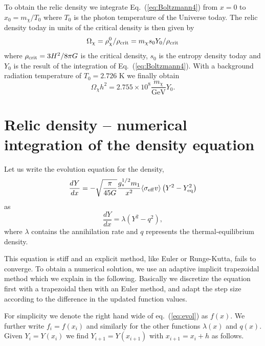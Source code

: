 \documentclass[a4paper,10pt,oneside]{book}
\begin{document}

To obtain the relic density we integrate Eq.~(\ref{eq:Boltzmann4})
from $x=0$ to $x_0=m_\chi/T_0$ where $T_0$ is the photon temperature
of the Universe today. The relic density today in units of the
critical density is then given by
\begin{equation}
  \Omega_\chi = \rho_\chi^0/\rho_{\rm
  crit}=m_\chi s_0 Y_0/\rho_{\rm crit}
\end{equation}
where $\rho_{\rm crit}=3 H^2/8 \pi G$ is the critical density, $s_{0}$ 
is the entropy density today and $Y_{0}$ is the result of the 
integration of Eq.~(\ref{eq:Boltzmann4}). With a
background radiation temperature of $T_0=2.726$ K we finally obtain
\begin{equation} \label{eq:omegah2}
  \Omega_\chi h^2 = 2.755\times 10^8 \frac{m_\chi}{\mbox{GeV}} Y_0.
\end{equation}

\section{Relic density -- numerical integration of the density equation}
\label{sec:numdens}

Let us write the evolution equation for the density,
\begin{equation} \label{eq:Boltzmann4}
  \frac{dY}{dx} = - \sqrt{\frac{\pi}{45G}} \frac{g_{*}^{1/2}m_1}{x^2}
  \langle \sigma_{\rm{eff}} v \rangle \left( Y^2 -
  Y_{\rm{eq}}^2 \right) 
\end{equation}
as
\begin{equation} 
  \frac{dY}{dx} = \lambda (Y^2 - q^2),
  \label{eq:evol}
\end{equation}
where $\lambda$ contains the annihilation rate and $q$ represents the
thermal-equilibrium density.

This equation is stiff and an explicit method, like Euler or Runge-Kutta, fails
to converge. To obtain a numerical solution, we use an adaptive implicit
trapezoidal method which we explain in the following.  Basically we discretize
the equation first with a trapezoidal then with an Euler method, and adapt the
step size according to the difference in the updated function values.

For simplicity we denote the right hand wide of eq.~(\ref{eq:evol}) as $f(x)$.
We further write $f_{i} = f(x_i)$ and similarly for the other functions
$\lambda(x)$ and $q(x)$. Given $Y_{i} = Y(x_i)$ we find $Y_{i+1} = Y(x_{i+1}) $
with $x_{i+1} = x_{i} + h$ as follows.
\end{document}
